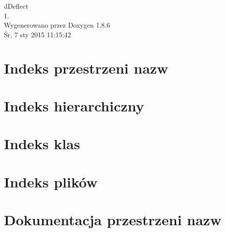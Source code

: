 \documentclass[twoside]{book}
\newcommand{\clearemptydoublepage}{%
  \newpage{\pagestyle{empty}\cleardoublepage}%
}
\begin{document}
\hypersetup{pageanchor=false}
\begin{titlepage}
\vspace*{7cm}
\begin{center}%
{\Large d\-Deflect \\[1ex]\large 1. }\\
\vspace*{1cm}
{\large Wygenerowano przez Doxygen 1.8.6}\\
\vspace*{0.5cm}
{\small Śr, 7 sty 2015 11:15:42}\\
\end{center}
\end{titlepage}
\clearemptydoublepage
\tableofcontents
\clearemptydoublepage
{}
\hypersetup{pageanchor=true}

\chapter{Indeks przestrzeni nazw}

\chapter{Indeks hierarchiczny}

\chapter{Indeks klas}

\chapter{Indeks plików}

\chapter{Dokumentacja przestrzeni nazw}

\end{document}
